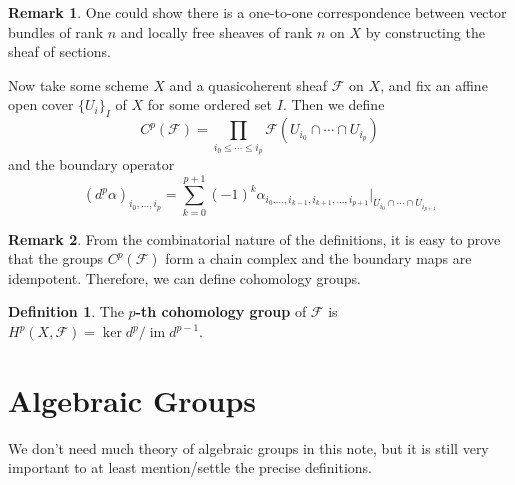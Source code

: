 \documentclass[12pt]{article}
\theoremstyle{remark}
\theoremstyle{definition}
\newtheorem{remark}{Remark}[section]
\newtheorem{definition}{Definition}[section]
\newcommand{\im}[0]{\operatorname{im}}
\begin{document}
    \begin{remark}
        One could show there is a one-to-one correspondence between vector bundles of rank $n$ and locally free sheaves of rank $n$ on $X$ by constructing the sheaf of sections.
    \end{remark}
    Now take some scheme $X$ and a quasicoherent sheaf $\mathcal F$ on $X$, and fix an affine open cover $\{U_i\}_I$ of $X$ for some ordered set $I$. Then we define
    \[C^p(\mathcal F)=\prod_{i_0\leqslant\cdots\leqslant i_p}\mathcal F(U_{i_0}\cap \cdots\cap U_{i_p})\]
    and the boundary operator
    \[(d^p\alpha)_{i_0,\dots,i_p}=\sum_{k=0}^{p+1}(-1)^{k}\alpha_{i_0.\dots, i_{k-1},i_{k+1},\dots, i_{p+1}}|_{U_{i_0}\cap\cdots\cap U_{i_{p+1}}}\]
    \begin{remark}
        From the combinatorial nature of the definitions, it is easy to prove that the groups $C^p(\mathcal F)$ form a chain complex and the boundary maps are idempotent. Therefore, we can define cohomology groups.
    \end{remark}
    \begin{definition}
        The \textbf{$p$-th cohomology group} of $\mathcal F$ is $H^p(X,\mathcal F)=\ker d^p/\im d^{p-1}$.
    \end{definition}
    \section{Algebraic Groups}
    We don't need much theory of algebraic groups in this note, but it is still very important to at least mention/settle the precise definitions.
\end{document}
